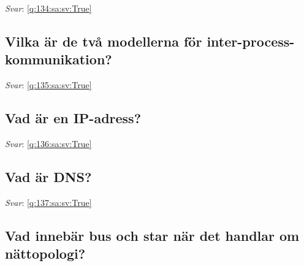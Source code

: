 \documentclass[a4paper,11pt,oneside]{article}
\begin{document}
\begin{sloppypar}
\vspace{1cm}

\textit{Svar}: \autoref{q:134:sa:sv:True}



\subsection{Vilka \"ar de tv\r{a} modellerna f\"or inter-process-kommunikation?}

\label{q:135:sa:sv:False}

\vspace{2cm}

\noindent\makebox[\textwidth]{\hrulefill}

\vspace{1cm}

\textit{Svar}: \autoref{q:135:sa:sv:True}



\subsection{Vad \"ar en IP-adress?}

\label{q:136:sa:sv:False}

\vspace{2cm}

\noindent\makebox[\textwidth]{\hrulefill}

\vspace{1cm}

\textit{Svar}: \autoref{q:136:sa:sv:True}



\subsection{Vad \"ar DNS?}

\label{q:137:sa:sv:False}

\vspace{2cm}

\noindent\makebox[\textwidth]{\hrulefill}

\vspace{1cm}

\textit{Svar}: \autoref{q:137:sa:sv:True}



\subsection{Vad inneb\"ar bus och star n\"ar det handlar om n\"attopologi?}


\end{sloppypar}
\end{document}
